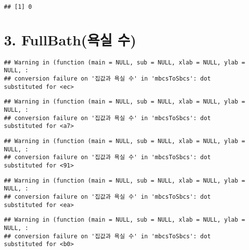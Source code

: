 \documentclass[
]{article}
\newenvironment{Shaded}{\begin{snugshade}}{\end{snugshade}}
\newcommand{\AttributeTok}[1]{\textcolor[rgb]{0.77,0.63,0.00}{#1}}
\newcommand{\DecValTok}[1]{\textcolor[rgb]{0.00,0.00,0.81}{#1}}
\newcommand{\FunctionTok}[1]{\textcolor[rgb]{0.00,0.00,0.00}{#1}}
\newcommand{\NormalTok}[1]{#1}
\newcommand{\SpecialCharTok}[1]{\textcolor[rgb]{0.00,0.00,0.00}{#1}}
\newcommand{\StringTok}[1]{\textcolor[rgb]{0.31,0.60,0.02}{#1}}
\begin{document}
\begin{verbatim}
## [1] 0
\end{verbatim}

\hypertarget{fullbathuxc695uxc2e4-uxc218}{%
\section{3. FullBath(욕실 수)}\label{fullbathuxc695uxc2e4-uxc218}}

\begin{Shaded}
\end{Shaded}

\begin{verbatim}
## Warning in (function (main = NULL, sub = NULL, xlab = NULL, ylab = NULL, :
## conversion failure on '집값과 욕실 수' in 'mbcsToSbcs': dot substituted for <ec>
\end{verbatim}

\begin{verbatim}
## Warning in (function (main = NULL, sub = NULL, xlab = NULL, ylab = NULL, :
## conversion failure on '집값과 욕실 수' in 'mbcsToSbcs': dot substituted for <a7>
\end{verbatim}

\begin{verbatim}
## Warning in (function (main = NULL, sub = NULL, xlab = NULL, ylab = NULL, :
## conversion failure on '집값과 욕실 수' in 'mbcsToSbcs': dot substituted for <91>
\end{verbatim}

\begin{verbatim}
## Warning in (function (main = NULL, sub = NULL, xlab = NULL, ylab = NULL, :
## conversion failure on '집값과 욕실 수' in 'mbcsToSbcs': dot substituted for <ea>
\end{verbatim}

\begin{verbatim}
## Warning in (function (main = NULL, sub = NULL, xlab = NULL, ylab = NULL, :
## conversion failure on '집값과 욕실 수' in 'mbcsToSbcs': dot substituted for <b0>
\end{verbatim}
\end{document}

